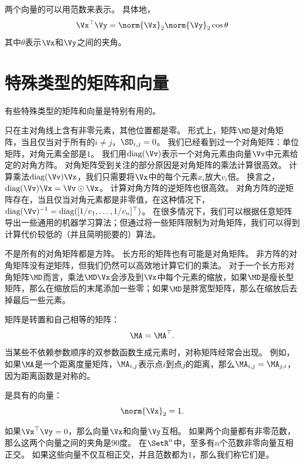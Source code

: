 两个向量的可以用范数来表示。
具体地，
\begin{equation}
    \Vx^\top\Vy = \norm{\Vx}_2\norm{\Vy}_2 \cos \theta
\end{equation}
其中$\theta$表示$\Vx$和$\Vy$之间的夹角。




\section{特殊类型的矩阵和向量}
\label{sec:special_kinds_of_matrices_and_vectors}

有些特殊类型的矩阵和向量是特别有用的。


只在主对角线上含有非零元素，其他位置都是零。
形式上，矩阵$\MD$是对角矩阵，当且仅当对于所有的$i\neq j$，$\SD_{i,j}=0$。
我们已经看到过一个对角矩阵：单位矩阵，对角元素全部是$1$。
我们用$\text{diag}(\Vv)$表示一个对角元素由向量$\Vv$中元素给定的对角方阵。
对角矩阵受到关注的部分原因是对角矩阵的乘法计算很高效。
计算乘法$\text{diag}(\Vv)\Vx$，我们只需要将$\Vx$中的每个元素$x_i$放大$v_i$倍。
换言之，$\text{diag}(\Vv)\Vx=\Vv \odot \Vx$。
计算对角方阵的逆矩阵也很高效。
对角方阵的逆矩阵存在，当且仅当对角元素都是非零值，在这种情况下，$\text{diag}(\Vv)^{-1}=\text{diag}([1/v_1,\dots,1/v_n]^\top)$。
在很多情况下，我们可以根据任意矩阵导出一些通用的机器学习算法；但通过将一些矩阵限制为对角矩阵，我们可以得到计算代价较低的（并且简明扼要的）算法。


不是所有的对角矩阵都是方阵。
长方形的矩阵也有可能是对角矩阵。
非方阵的对角矩阵没有逆矩阵，但我们仍然可以高效地计算它们的乘法。
对于一个长方形对角矩阵$\MD$而言，乘法$\MD\Vx$会涉及到$\Vx$中每个元素的缩放，如果$\MD$是瘦长型矩阵，那么在缩放后的末尾添加一些零；如果$\MD$是胖宽型矩阵，那么在缩放后去掉最后一些元素。



矩阵是转置和自己相等的矩阵：
\begin{equation}
    \MA=\MA^\top.
\end{equation}
当某些不依赖参数顺序的双参数函数生成元素时，对称矩阵经常会出现。
例如，如果$\MA$是一个距离度量矩阵，$\MA_{i,j}$表示点$i$到点$j$的距离，那么$\MA_{i,j}=\MA_{j,i}$，因为距离函数是对称的。


是具有的向量：
\begin{equation}
\norm{\Vx}_2=1.
\end{equation}


如果$\Vx^\top \Vy = 0$，那么向量$\Vx$和向量$\Vy$互相。
如果两个向量都有非零范数，那么这两个向量之间的夹角是$90$度。
在$\SetR^n$中，至多有$n$个范数非零向量互相正交。
如果这些向量不仅互相正交，并且范数都为$1$，那么我们称它们是。



